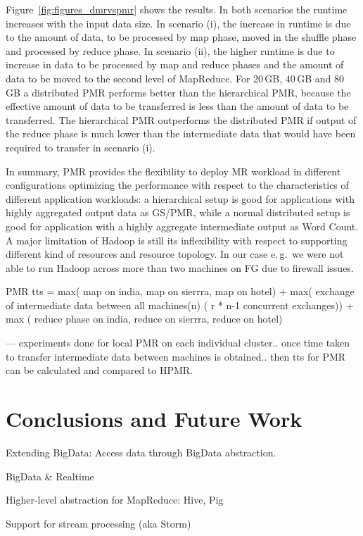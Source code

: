 \documentclass{acm_proc_article-sp}
\begin{document}
Figure~\ref{fig:figures_dmrvspmr} shows the results. In both scenarios the
runtime increases with the input data size. In scenario (i), the increase in
runtime is due to the amount of data, to be processed by map phase, moved in
the shuffle phase and processed by reduce phase. In scenario (ii), the higher
runtime is due to increase in data to be processed by map and reduce phases
and the amount of data to be moved to the second level of MapReduce. For
20\,GB, 40\,GB and 80\,GB a distributed PMR performs better than the
hierarchical PMR, because the effective amount of data to be transferred is
less than the amount of data to be transferred. The hierarchical PMR 
outperforms the distributed PMR if output of the reduce phase is much lower 
than the intermediate data that would have been required to transfer in 
scenario (i).

In summary, PMR provides the flexibility to deploy MR workload in different
configurations optimizing the performance with respect to the characteristics
of different application workloads: a hierarchical setup is good for
applications with highly aggregated output data as GS/PMR, while a normal
distributed setup is good for application with a highly aggregate intermediate
output as Word Count. A major limitation of Hadoop is still its inflexibility
with respect to supporting different kind of resources and resource topology.
In our case e.\,g.\ we were not able to run Hadoop across more than two
machines on FG due to firewall issues.


PMR tts = max( map  on india, map on  sierrra, map on hotel) + max( exchange of intermediate data between all machines(n) ( r * n-1 concurrent exchanges)) + max ( reduce phase on  india, reduce on  sierrra, reduce on hotel)

--- experiments done for local PMR on each individual cluster.. once time 
taken to transfer intermediate data between machines is obtained.. then tts 
for PMR can be calculated and compared to HPMR.


\section{Conclusions and Future Work}
\label{sec-conclusion}

Extending BigData: Access data through BigData abstraction.

BigData \& Realtime

Higher-level abstraction for MapReduce: Hive, Pig


Support for stream processing (aka Storm)
\end{document}
